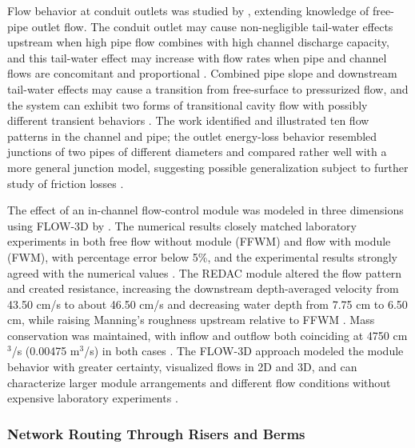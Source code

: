 \documentclass[11pt]{article}
\begin{document}
Flow behavior at conduit outlets was studied by \textcite{Nédélec2008}, extending
knowledge of free-pipe outlet flow. The conduit outlet may cause non-negligible tail-water
effects upstream when high pipe flow combines with high channel discharge capacity, and
this tail-water effect may increase with flow rates when pipe and channel flows are
concomitant and proportional \parencite{Nédélec2008}. Combined pipe slope and downstream
tail-water effects may cause a transition from free-surface to pressurized flow, and the
system can exhibit two forms of transitional cavity flow with possibly different transient
behaviors \parencite{Nédélec2008}. The work identified and illustrated ten flow patterns
in the channel and pipe; the outlet energy-loss behavior resembled junctions of two pipes
of different diameters and compared rather well with a more general junction model,
suggesting possible generalization subject to further study of friction losses
\parencite{Nédélec2008}.

The effect of an in-channel flow-control module was modeled in three dimensions using
FLOW-3D by \textcite{Abdurrasheed2019}. The numerical results closely matched laboratory
experiments in both free flow without module (FFWM) and flow with module (FWM), with
percentage error below 5\%, and the experimental results strongly agreed with the numerical
values \parencite{Abdurrasheed2019}. The REDAC module altered the flow pattern and created
resistance, increasing the downstream depth-averaged velocity from 43.50 cm/s to about
46.50 cm/s and decreasing water depth from 7.75 cm to 6.50 cm, while raising Manning's
roughness upstream relative to FFWM \parencite{Abdurrasheed2019}. Mass conservation was
maintained, with inflow and outflow both coinciding at 4750 cm$^3$/s (0.00475 m$^3$/s) in
both cases \parencite{Abdurrasheed2019}. The FLOW-3D approach modeled the module behavior
with greater certainty, visualized flows in 2D and 3D, and can characterize larger module
arrangements and different flow conditions without expensive laboratory experiments
\parencite{Abdurrasheed2019}.

\subsubsection{Network Routing Through Risers and Berms}
\end{document}
